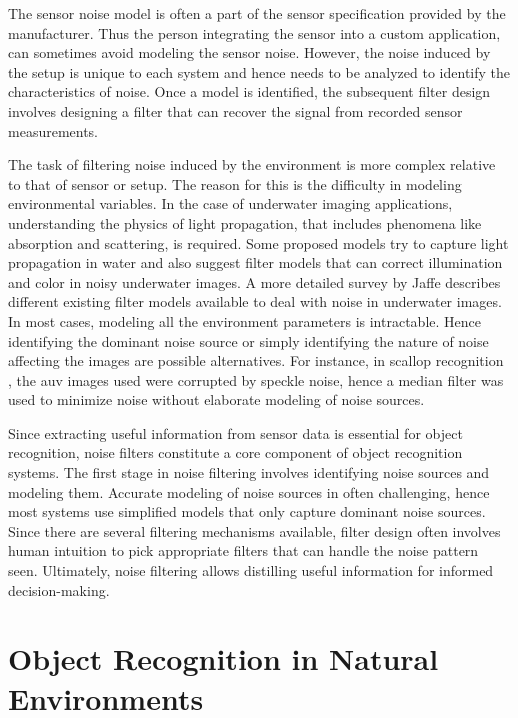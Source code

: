 \documentclass {udthesis}
\begin{document}
The sensor noise model is often a part of the sensor specification provided by the manufacturer. 
Thus the person integrating the sensor into a custom application, can sometimes avoid modeling the sensor noise. 
However, the noise induced by the setup is unique to each system and hence needs to be analyzed to identify the characteristics of noise.
Once a model is identified, the subsequent filter design involves designing a filter that can recover the signal from recorded sensor measurements.

The task of filtering noise induced by the environment is more complex relative to that
of sensor or setup.
The reason for this is the difficulty in modeling environmental variables. 
In the case of underwater imaging applications, understanding the physics of 
light propagation, that includes phenomena like absorption and scattering, is required. Some proposed models \cite{garcia, ahlen} try to 
capture light propagation in water and also suggest filter models that can correct illumination and color in noisy underwater images. A more detailed survey
by Jaffe \cite{jaffe} describes different existing filter models available to deal with noise in underwater images.
In most cases, modeling all the environment parameters is intractable. Hence identifying the dominant noise source or simply identifying the nature of noise affecting the images are possible alternatives.
For instance, in scallop recognition \cite{prasanna_aslo}, the \gls{auv} images used were corrupted by speckle noise, hence a median filter \cite{despeckle} was used to minimize noise without elaborate modeling of noise sources.

Since extracting useful information from sensor data is essential for object recognition, noise filters constitute a core component of object recognition systems. The first stage in noise filtering involves identifying noise sources and modeling them. Accurate modeling of noise sources in often challenging, hence most systems use simplified models that only capture dominant noise sources. Since there are several filtering mechanisms available, filter design often involves human intuition to pick appropriate filters that can handle the noise pattern seen. Ultimately, noise filtering allows distilling useful information for informed decision-making.

\section{Object Recognition in Natural Environments}
\end{document}
